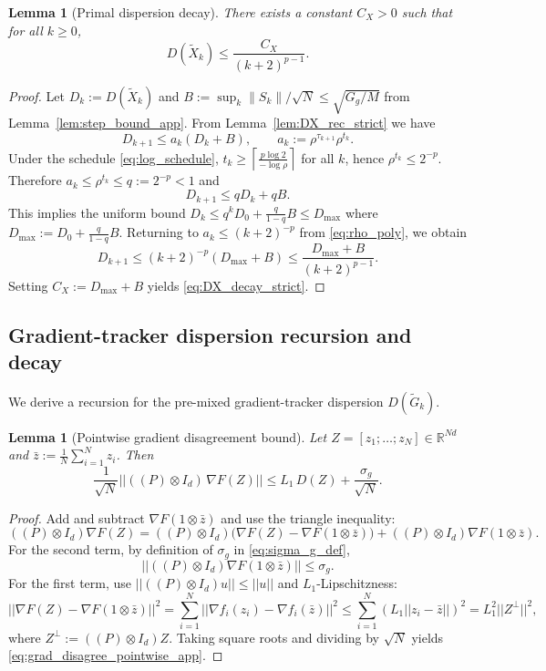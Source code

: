 \documentclass[11pt,a4paper]{article}
\def\one{1}%
\def\J{J}%
\def\Pmat{P}%
\def\norm#1{||#1||}%
\newtheorem{lemma}[theorem]{Lemma}
\newcommand{\R}{\mathbb{R}}
\newcommand{\one}{\mathbf{1}}
\newcommand{\norm}[1]{\left\|#1\right\|}
\newcommand{\J}{\left(\frac{1}{N}\one\one^\top\right)}
\newcommand{\Pmat}{I-\J}
\begin{document}
	\begin{lemma}[Primal dispersion decay]\label{lem:DX_decay_strict}
		There exists a constant $C_X>0$ such that for all $k\ge 0$,
		\begin{equation}\label{eq:DX_decay_strict}
			D(\tilde X_k)\le \frac{C_X}{(k+2)^{p-1}}.
		\end{equation}
	\end{lemma}
\begin{proof}
	Let $D_k:=D(\tilde X_k)$ and $B:=\sup_k\|S_k\|/\sqrt N\le \sqrt{G_g/M}$ from Lemma~\ref{lem:step_bound_app}.
	From Lemma~\ref{lem:DX_rec_strict} we have
	\[
	D_{k+1}\le a_k(D_k+B),\qquad a_k:=\rho^{\tau_{k+1}}\rho^{t_k}.
	\]
	Under the schedule \eqref{eq:log_schedule}, $t_k\ge \left\lceil \frac{p\log 2}{-\log\rho}\right\rceil$ for all $k$,
	hence $\rho^{t_k}\le 2^{-p}$. Therefore $a_k\le \rho^{t_k}\le q:=2^{-p}<1$ and
	\[
	D_{k+1}\le q D_k+qB.
	\]
	This implies the uniform bound $D_k\le q^kD_0+\frac{q}{1-q}B\le D_{\max}$ where
	$D_{\max}:=D_0+\frac{q}{1-q}B$.
	Returning to $a_k\le (k+2)^{-p}$ from \eqref{eq:rho_poly}, we obtain
	\[
	D_{k+1}\le (k+2)^{-p}(D_{\max}+B)\le \frac{D_{\max}+B}{(k+2)^{p-1}}.
	\]
	Setting $C_X:=D_{\max}+B$ yields \eqref{eq:DX_decay_strict}.
\end{proof}
	
	
	\subsection{Gradient-tracker dispersion recursion and decay}
	
	We derive a recursion for the pre-mixed gradient-tracker dispersion $D(\tilde G_k)$.
	
	\begin{lemma}[Pointwise gradient disagreement bound]\label{lem:grad_disagree_pointwise_app}
		Let $Z=[z_1;\dots;z_N]\in\R^{Nd}$ and $\bar z:=\frac1N\sum_{i=1}^N z_i$.
		Then
		\begin{equation}\label{eq:grad_disagree_pointwise_app}
			\frac{1}{\sqrt N}\norm{((\Pmat)\otimes I_d)\,\nabla F(Z)}
			\le L_1\,D(Z)+\frac{\sigma_g}{\sqrt N}.
		\end{equation}
	\end{lemma}
	\begin{proof}
		Add and subtract $\nabla F(\one\otimes\bar z)$ and use the triangle inequality:
		\[
		((\Pmat)\otimes I_d)\nabla F(Z)=((\Pmat)\otimes I_d)\big(\nabla F(Z)-\nabla F(\one\otimes\bar z)\big)+((\Pmat)\otimes I_d)\nabla F(\one\otimes\bar z).
		\]
		For the second term, by definition of $\sigma_g$ in \eqref{eq:sigma_g_def},
		\[
		\norm{((\Pmat)\otimes I_d)\nabla F(\one\otimes\bar z)}\le \sigma_g.
		\]
		For the first term, use $\norm{((\Pmat)\otimes I_d)u}\le \norm{u}$ and $L_1$-Lipschitzness:
		\[
		\norm{\nabla F(Z)-\nabla F(\one\otimes\bar z)}^2
		=\sum_{i=1}^N\norm{\nabla f_i(z_i)-\nabla f_i(\bar z)}^2
		\le \sum_{i=1}^N (L_1\norm{z_i-\bar z})^2
		=L_1^2\norm{Z^\perp}^2,
		\]
		where $Z^\perp:=((\Pmat)\otimes I_d)Z$.
		Taking square roots and dividing by $\sqrt N$ yields \eqref{eq:grad_disagree_pointwise_app}.
	\end{proof}
	
\end{document}
